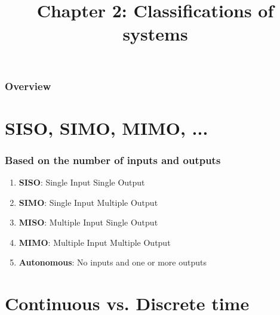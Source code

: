 \documentclass{beamer}
\title{Chapter 2: Classifications of systems}
\author{}
\begin{document}
\begin{frame}
\titlepage %
\end{frame}

\begin{frame}
\frametitle{Overview} %
\tableofcontents %
\end{frame}


\section{SISO, SIMO, MIMO, ...} 

\begin{frame}
\frametitle{Based on the number of inputs and outputs}
\vspace{-8ex}
\begin{enumerate}
\item \textbf{SISO}: Single Input Single Output
\medskip
\item \textbf{SIMO}: Single Input Multiple Output
\medskip
\item \textbf{MISO}: Multiple Input Single Output
\medskip
\item \textbf{MIMO}: Multiple Input Multiple Output
\medskip
\item \textbf{Autonomous}: No inputs and one or more outputs
\end{enumerate}
\end{frame}

\section{Continuous vs. Discrete time} 
\end{document}
